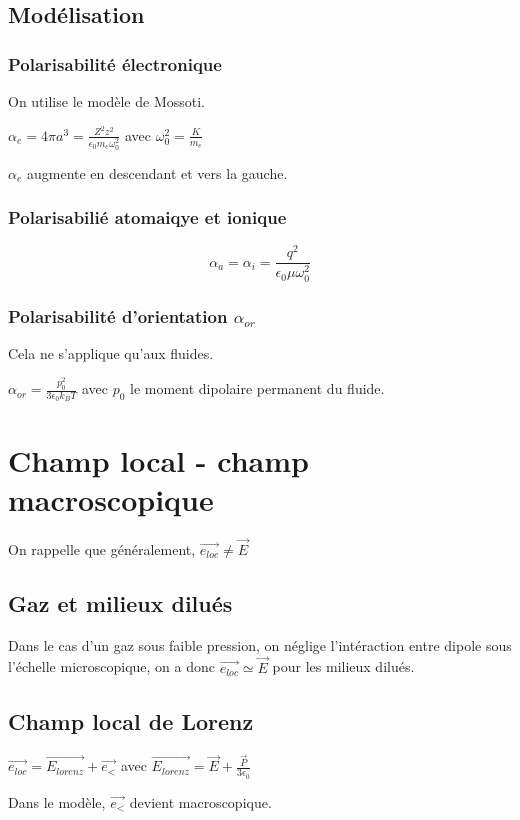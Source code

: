 \documentclass[french]{yLectureNote}
\renewcommand{\vec}{\overrightarrow}
\begin{document}
\subsection{Modélisation}
\subsubsection{Polarisabilité électronique}
On utilise le modèle de Mossoti.
\begin{theorem}
    $\alpha_e = 4\pi a^3 = \frac{Z^2z^2}{\epsilon_0m_e\omega_0^2}$ avec $\omega_0^2 = \frac{K}{m_e}$
\end{theorem}
$\alpha_e$ augmente en descendant et vers la gauche.
\subsubsection{Polarisabilié atomaiqye et ionique}
\begin{theorem}
    $$\alpha_a = \alpha_i = \frac{q^2}{\epsilon_0\mu \omega_0^2}$$
\end{theorem}
\subsubsection{Polarisabilité d'orientation $\alpha_{or}$}
Cela ne s'applique qu'aux fluides.
\begin{theorem}[$\alpha_{or}$][PASSER]
    $\alpha_{or} = \frac{p_0^2}{3\epsilon_0k_BT}$ avec $p_0$ le moment dipolaire permanent du fluide.
\end{theorem}
\section{Champ local - champ macroscopique}
On rappelle que généralement, $\vec{e_{loc}}\neq \vec{E}$
\subsection{Gaz et milieux dilués}
Dans le cas d'un gaz sous faible pression, on néglige l'intéraction entre dipole sous l'échelle microscopique, on a donc 
$\vec{e_{loc}}\simeq \vec{E}$ pour les milieux dilués.
\subsection{Champ local de Lorenz}
\begin{theorem}[PASSER]
    $\vec{e_{loc}}=\vec{E_{lorenz}}+\vec{e_{<}}$ avec $\vec{E_{lorenz}} = \vec{E}+\frac{\vec{P}}{3\epsilon_0}$

    Dans le modèle, $\vec{e_{<}}$ devient macroscopique.
\end{theorem}
\end{document}
